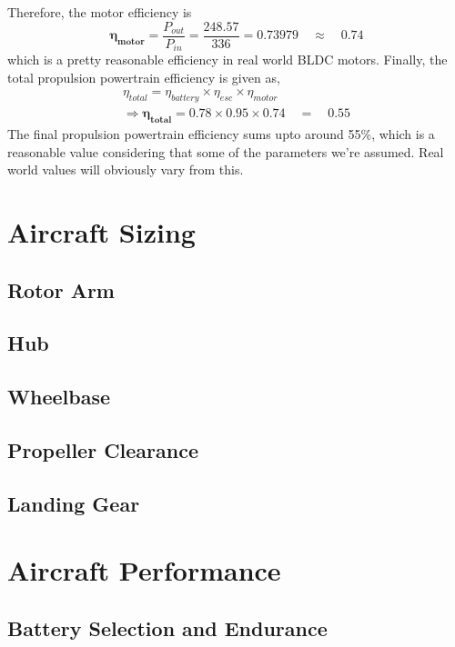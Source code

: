 \documentclass[12pt]{report}
\begin{document}
  Therefore, the motor efficiency is \[ \boldsymbol{\eta_{motor}} = \frac{P_{out}}{P_{in}} = \frac{248.57}{336} = 0.73979 \quad \approx \quad \boldsymbol{0.74} \] which is a pretty reasonable efficiency in real world BLDC motors. Finally, the total propulsion powertrain efficiency is given as, 
  \begin{gather*}
    \eta_{total} = \eta_{battery} \times \eta_{esc} \times \eta_{motor} \\
    \Rightarrow \boldsymbol{\eta_{total}} = 0.78 \times 0.95 \times 0.74 \quad = \quad \boldsymbol{0.55}
  \end{gather*}
  The final propulsion powertrain efficiency sums upto around 55\%, which is a reasonable value considering that some of the parameters we're assumed. Real world values will obviously vary from this.
      
     
    \section{Aircraft Sizing}
      \subsection*{Rotor Arm}
      \subsection*{Hub}
      \subsection*{Wheelbase}
      \subsection*{Propeller Clearance}
      \subsection*{Landing Gear}
        
    \section{Aircraft Performance}
      \subsection{Battery Selection and Endurance}
\end{document}
